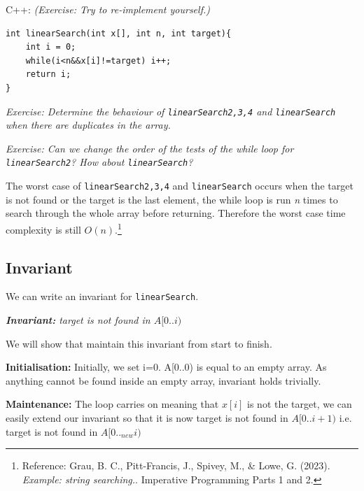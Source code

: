 C++: \textit{(Exercise:  Try to re-implement yourself.)}
\begin{lstlisting} 
int linearSearch(int x[], int n, int target){
    int i = 0;
    while(i<n&&x[i]!=target) i++;
    return i;
}
\end{lstlisting}

\textit{Exercise: Determine the behaviour of \texttt{linearSearch2,3,4} and \texttt{linearSearch} when there are duplicates in the array.}

\vspace{6mm}

\textit{Exercise: Can we change the order of the tests of the while loop for \texttt{linearSearch2}? How about \texttt{linearSearch}?}
\vspace{6mm}

The worst case of \texttt{linearSearch2,3,4} and \texttt{linearSearch} occurs when the target is not found or the target is the last element, the while loop is run \textit{n} times to search through the whole array before returning. Therefore the worst case time complexity is still $O(n)$.\footnote{Reference: Grau, B. C., Pitt-Francis, J., Spivey, M., \& Lowe, G. (2023). \textit{Example: string searching.}. Imperative Programming Parts 1 and 2.}

\if{}

\subsection*{Invariant}

We can write an invariant for \texttt{linearSearch}.

\begin{center}
    \textit{\textbf{Invariant:}\hspace{6mm} target is not found in $A[0..i)$}
\end{center}

We will show that maintain this invariant from start to finish. 
\vspace{6mm}

\textbf{Initialisation:} Initially, we set i=0. A[0..0) is equal to an empty array. As anything cannot be found inside an empty array, invariant holds trivially.
\vspace{6mm}

\textbf{Maintenance:} The loop carries on meaning that $x[i]$ is not the target, we can easily extend our invariant so that it is now target is not found in $A[0..i+1)$ i.e. target is not found in $A[0.._{new}i)$
\vspace{6mm}

